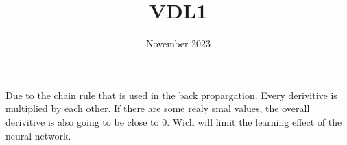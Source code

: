 

\date{November 2023}

\title{VDL1}


\maketitle

\section{}
\subsection{}
\subsection{}
\subsubsection{}
Due to the chain rule that is used in the back propargation. Every derivitive is multiplied by each other. If there are some realy smal values, the overall derivitive is also going to be close to 0. Wich will limit the learning effect of the neural network.
